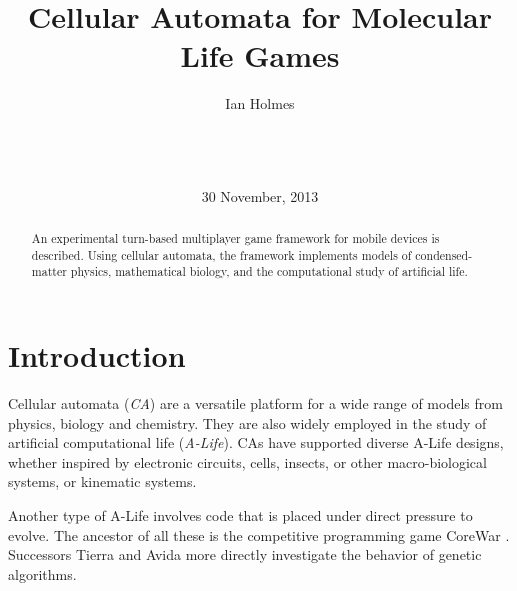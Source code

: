 \documentclass{acm_proc_article-sp}
\begin{document}
\title{Cellular Automata for Molecular Life Games}
\author{
\alignauthor
Ian Holmes\\
       \\
       \\
       \\
}
\date{30 November, 2013}

\maketitle
\begin{abstract}
An experimental turn-based multiplayer game framework for mobile devices is described.
Using cellular automata, the framework implements models
of condensed-matter physics, mathematical biology,
and the computational study of artificial life.
\end{abstract}



\section{Introduction}

Cellular automata ({\em CA}) are a versatile platform for a wide
range of models from physics, biology and chemistry\cite{Schiff2007}.
They are also widely employed in the study of artificial computational life ({\em A-Life}).
CAs have supported diverse A-Life designs,
whether inspired by electronic circuits\cite{VonNeumannBook,Wireworld},
cells, insects, or other macro-biological systems\cite{ConwaysLife,Langton1986},
or kinematic systems\cite{Stevens2011}.

Another type of A-Life involves code that is placed under direct pressure to evolve.
The ancestor of all these is the competitive programming game CoreWar
\cite{CoreWarGuidelines84,BarkleyWaitSchmidtCoreWar2004}.
Successors Tierra\cite{Tierra} and Avida\cite{Avida} more directly investigate the
behavior of genetic algorithms.
\end{document}
